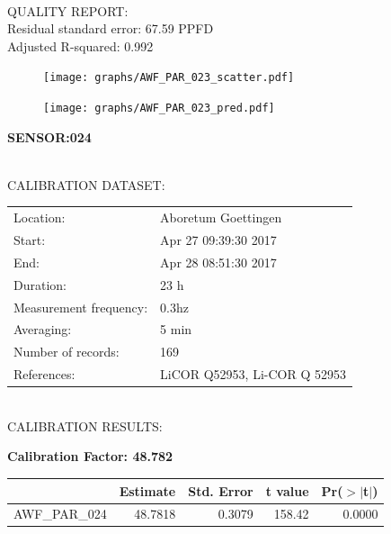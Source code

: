 \documentclass[oneside]{report}
\begin{document}
\hrulefill\\
QUALITY REPORT:\\
Residual standard error: 67.59 PPFD\\
Adjusted R-squared: 0.992



\begin{figure}[H]
  \centering
  \texttt{[image: graphs/AWF\_PAR\_023\_scatter.pdf]}
\end{figure}




\begin{figure}[H]
  \centering
  \texttt{[image: graphs/AWF\_PAR\_023\_pred.pdf]}
\end{figure}

\pagebreak


\begin{center}
\large{\textbf{SENSOR:024}}\\
\end{center}

\hrulefill\\
CALIBRATION DATASET:\\
\begin{table}[h!]
  \centering
  \label{tab:table1}
  \begin{tabular}{ll}
    Location: & Aboretum Goettingen\\ 
    
    
    Start:  & Apr 27 09:39:30 2017 \\
    End:   & Apr 28 08:51:30 2017\\ 
    Duration: & 23 h\\
    Measurement frequency: & 0.3hz\\
    Averaging:  &5 min\\
    Number of records: & 169 \\
    References: & LiCOR Q52953, Li-COR Q 52953 \\
  \end{tabular}
\end{table}

\hrulefill\\
CALIBRATION RESULTS:\\


\begin{center}
\textbf{\large{Calibration Factor: 48.782}}\\
\end{center}
\begin{table}[ht]
\centering
\begin{tabular}{rrrrr}
  \hline
 & Estimate & Std. Error & t value & Pr($>$$|$t$|$) \\ 
  \hline
AWF\_PAR\_024 & 48.7818 & 0.3079 & 158.42 & 0.0000 \\ 
   \hline
\end{tabular}
\end{table}
\end{document}
